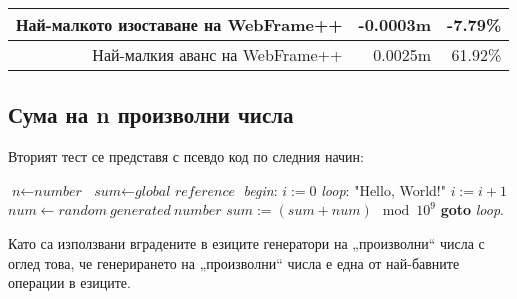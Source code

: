 \documentclass[documentation.tex]{subfiles}
\begin{document}
\begin{longtable}{|r|r|r|r|r|}
        \multicolumn{3}{|r|}{Най-малкото изоставане на WebFrame++}                                                                                                                                                                                   & {\color[HTML]{FF0000} -0.0003m}                       & {\color[HTML]{FF0000} -7.79\%}                         \\ \hline
        \multicolumn{3}{|r|}{Най-малкия аванс на WebFrame++}                                                                                                                                                                                         & {\color[HTML]{32CB00} 0.0025m}                        & {\color[HTML]{32CB00} 61.92\%}                         \\ \hline
        \end{longtable}
\subsection{Сума на n произволни числа}
    Вторият тест се представя с псевдо код по следния начин:
    \begin{algorithm}
    \caption{}\label{test1}
        \begin{algorithmic}[1]
                \State $\textit{n} \gets \textit{number}$
                \State $\textit{sum} \gets \textit{global reference}$
                \BState \emph{begin}:
                \State $\textit{i} := 0$
                \BState \emph{loop}:
                 \Return "Hello, World!"
                \EndIf
                    \State $\textit{i} := \textit{i} + 1$
                    \State $\textit{num} \gets random\ generated\ number$
                    \State $\textit{sum}:=(\textit{sum}+\textit{num})\mod{10^{9}}$
                    \State \textbf{goto} \emph{loop}.
                \EndIf
            \EndProcedure
        \end{algorithmic}
    \end{algorithm}

    Като са използвани вградените в езиците генератори на „произволни“ числа с оглед това, че генерирането на „произволни“ числа е една от най-бавните операции в езиците.
\end{document}
